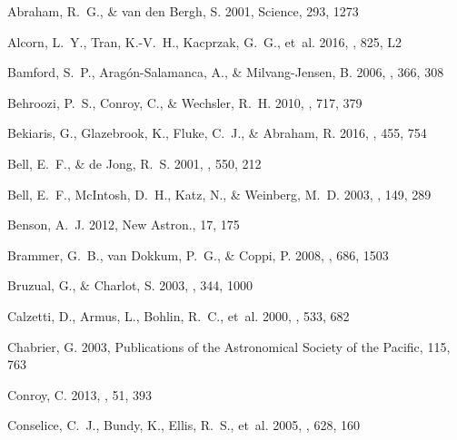 \documentclass{emulateapj}
\newcommand*\na{New Astron.}
\begin{document}
{\begin{thebibliography}{}
{Abraham}, R.~G., \& {van den Bergh}, S. 2001, Science, 293, 1273

{Alcorn}, L.~Y., {Tran}, K.-V.~H., {Kacprzak}, G.~G., {et~al.} 2016, \apjl,
  825, L2

{Bamford}, S.~P., {Arag{\'o}n-Salamanca}, A., \& {Milvang-Jensen}, B. 2006,
  \mnras, 366, 308

{Behroozi}, P.~S., {Conroy}, C., \& {Wechsler}, R.~H. 2010, \apj, 717, 379

{Bekiaris}, G., {Glazebrook}, K., {Fluke}, C.~J., \& {Abraham}, R. 2016,
  \mnras, 455, 754

{Bell}, E.~F., \& {de Jong}, R.~S. 2001, \apj, 550, 212

{Bell}, E.~F., {McIntosh}, D.~H., {Katz}, N., \& {Weinberg}, M.~D. 2003, \apjs,
  149, 289

{Benson}, A.~J. 2012, \na, 17, 175

{Brammer}, G.~B., {van Dokkum}, P.~G., \& {Coppi}, P. 2008, \apj, 686, 1503

{Bruzual}, G., \& {Charlot}, S. 2003, \mnras, 344, 1000

{Calzetti}, D., {Armus}, L., {Bohlin}, R.~C., {et~al.} 2000, \apj, 533, 682

Chabrier, G. 2003, Publications of the Astronomical Society of the Pacific,
  115, 763

{Conroy}, C. 2013, \araa, 51, 393

{Conselice}, C.~J., {Bundy}, K., {Ellis}, R.~S., {et~al.} 2005, \apj, 628, 160


\end{thebibliography}}
\end{document}
